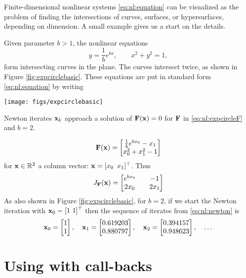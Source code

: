 Finite-dimensional nonlinear systems \eqref{eq:nl:equation} can be visualized as the problem of finding the intersections of curves, surfaces, or hypersurfaces, depending on dimension.  A small example gives us a start on the details.

\clearpage
\noindent\hrulefill
\begin{example}  Given parameter $b > 1$, the nonlinear equations
    $$y = \frac{1}{b} e^{bx}, \qquad x^2+y^2 = 1,$$
form intersecting curves in the plane.  The curves intersect twice, as shown in Figure \ref{fig:expcirclebasic}.  These equations are put in standard form \eqref{eq:nl:equation} by writing

\begin{marginfigure}
\texttt{[image: figs/expcirclebasic]}

\medskip
\caption{Newton iterates $\mathbf{x}_k$ approach a solution of $\mathbf{F}(\mathbf{x})=0$ for $\mathbf{F}$ in \eqref{eq:nl:expcircleF} and $b=2$.}
\label{fig:expcirclebasic}
\end{marginfigure}

\begin{equation}
\label{eq:nl:expcircleF}
\mathbf{F}(\mathbf{x}) = \begin{bmatrix}
           \frac{1}{b} e^{b x_0} - x_1 \\
           x_0^2 + x_1^2 - 1
           \end{bmatrix}
\end{equation}
for $\mathbf{x}\in \mathbb{R}^2$ a column vector: $\mathbf{x} = [x_0 \,\,\, x_1]^\top$.  Thus
\begin{equation}
\label{eq:nl:ecjacobian}
J_{\mathbf{F}}(\mathbf{x}) = \begin{bmatrix}
    e^{b x_0} & & -1 \\
    2 x_0   & & 2 x_1 \end{bmatrix}
\end{equation}
As also shown in Figure \ref{fig:expcirclebasic}, for $b=2$, if we start the Newton iteration with $\mathbf{x}_0 = [1 \,\, 1]^\top$ then the sequence of iterates from \eqref{eq:nl:newton} is
    $${\mathbf{x}}_{0} = \begin{bmatrix} 1 \\ 1 \end{bmatrix}, \quad {\mathbf{x}}_{1} = \begin{bmatrix} 0.619203 \\ 0.880797 \end{bmatrix}, \quad {\mathbf{x}}_{2} = \begin{bmatrix} 0.394157 \\ 0.948623 \end{bmatrix}, \quad \dots$$
\noindent\hrulefill
\end{example}


\section{Using \pSNES with call-backs} \label{sec:usingsnes}

